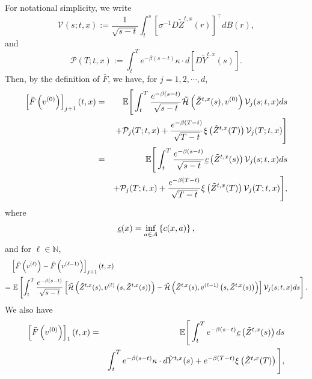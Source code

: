 \documentclass[11pt]{article}
\theoremstyle{definition}
\theoremstyle{plain}
\newcommand{\E}{\mathbb{E}}
\newcommand{\N}{\mathbb{N}}
\newcommand{\cH}{{\cal H}}
\begin{document}
For notational simplicity, we write 
\begin{equation}\label{eq:bel}
\mathcal{V}(s; t, x) := \frac{1}{\sqrt{s-t}} \int_t^s \left[\sigma^{-1} D\tilde{Z}^{t,x}(r)\right]^{\top} dB(r), 
\end{equation}
and 
\begin{equation}\label{eq:pushing-penalty}
\mathcal{P}(T; t,x) := \int_t^T e^{-\beta (s-t)} \kappa \cdot d\left[D\tilde Y^{t,x}(s)\right].
\end{equation}
Then, by the definition of $\bar F$, we have, for $j = 1, 2, \cdots, d$, 
\begin{eqnarray}
\left[\bar F\left(v^{(0)}\right)\right]_{j+1}(t,x) &=& \E\Bigg[\int_t^T \frac{e^{-\beta(s-t)}}{\sqrt{s-t}} \tilde \cH\left(\tilde{Z}^{t,x}(s), v^{(0)}\right) \mathcal{V}_j(s; t,x) ds \nonumber \\
& & + \mathcal{P}_j(T; t,x) + \frac{e^{-\beta (T-t)}}{\sqrt{T-t}}\xi\left(\tilde{Z}^{t,x}(T)\right) \mathcal{V}_j(T; t,x) \Bigg] \nonumber \\
&=& \E\Bigg[\int_t^T \frac{e^{-\beta(s-t)}}{\sqrt{s-t}} \underbar{\em c}\left(\tilde{Z}^{t,x}(s)\right) \mathcal{V}_j(s; t,x) ds \nonumber \\
& & + \mathcal{P}_j(T; t,x) + \frac{e^{-\beta (T-t)}}{\sqrt{T-t}}\xi\left(\tilde{Z}^{t,x}(T)\right) \mathcal{V}_j(T; t,x)\Bigg], 
\label{eq:phi-v0}
\end{eqnarray}
where 
\begin{equation}
\underbar{\em c}(x) = \inf_{a \in \mathcal{A}} \left\{c(x, a)\right\},
\end{equation}
and for $\ell \in \N$,
\begin{align}\label{eq:phi-vl-phi-vl-1}
& \left[\bar F\left(v^{(\ell)}\right)-\bar F\left(v^{(\ell-1)}\right)\right]_{j+1}(t,x) \nonumber \\
=& \ \E\left[\int_t^T \frac{e^{-\beta(s-t)}}{\sqrt{s-t}} \left[\tilde \cH\left(\tilde{Z}^{t,x}(s), v^{(\ell)}\left(s,\tilde{Z}^{t,x}(s)\right)\right) - \tilde \cH\left(\tilde{Z}^{t,x}(s), v^{(\ell-1)}\left(s,\tilde{Z}^{t,x}(s)\right)\right) \right] \mathcal{V}_j (s; t, x) ds \right].
\end{align}
We also have 
\begin{eqnarray}
\left[\bar F\left(v^{(0)}\right)\right]_1(t,x) &=& \E\Bigg[\int_t^T e^{-\beta(s-t)} \underbar{\em c}\left(\tilde{Z}^{t,x}(s)\right) ds \nonumber \\
& & \int_t^T e^{-\beta (s-t)}\kappa\cdot d\tilde Y^{t,x}(s) + e^{-\beta (T-t)}\xi\left(\tilde{Z}^{t,x}(T)\right) \Bigg], 
\label{eq:phi-v0-1}
\end{eqnarray}
\end{document}
